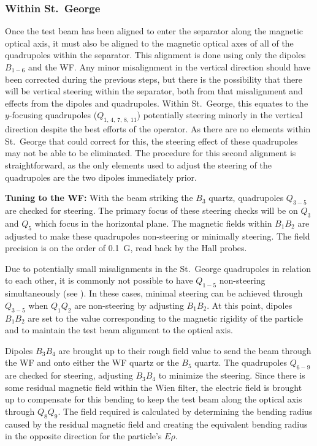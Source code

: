 \subsubsection{Within St.\ George}
\label{sec:tuning_stg}

Once the test beam has been aligned to enter the separator along the
magnetic optical axis, it must also be aligned to the magnetic optical
axes of all of the quadrupoles within the separator. This alignment is
done using only the dipoles $B_{1-6}$ and the WF. Any minor misalignment
in the vertical direction should have been corrected during the previous
steps, but there is the possibility that there will be vertical steering
within the separator, both from that misalignment and effects from the
dipoles and quadrupoles. Within St.\ George, this equates to the
$y$-focusing quadrupoles ($Q_{1,\,4,\,7,\,8,\,11}$) potentially steering
minorly in the vertical direction despite the best efforts of the
operator. As there are no elements within St.\ George that could correct
for this, the steering effect of these quadrupoles may not be able to be
eliminated. The procedure for this second alignment is straightforward,
as the only elements used to adjust the steering of the quadrupoles are
the two dipoles immediately prior.

\textbf{Tuning to the WF:}
With the beam striking the $B_3$ quartz, quadrupoles $Q_{3-5}$ are
checked for steering. The primary focus of these steering checks will be
on $Q_3$ and $Q_5$ which focus in the horizontal plane. The magnetic
fields within $B_1B_2$ are adjusted to make these quadrupoles
non-steering or minimally steering. The field precision is on the order
of 0.1~G, read back by the Hall probes.

Due to potentially small misalignments in the St.\ George quadrupoles in
relation to each other, it is commonly not possible to have $Q_{1-5}$
non-steering simultaneously (see \cite{Meisel2017}). In these cases,
minimal steering can be achieved through $Q_{3-5}$ when $Q_1Q_2$ are
non-steering by adjusting $B_1B_2$. At this point, dipoles $B_1B_2$ are
set to the value corresponding to the magnetic rigidity of the particle
and to maintain the test beam alignment to the optical axis.

Dipoles $B_3B_4$ are brought up to their rough field value to send the
beam through the WF and onto either the WF quartz or the $B_5$ quartz.
The quadrupoles $Q_{6-9}$ are checked for steering, adjusting $B_3B_4$
to minimize the steering. Since there is some residual magnetic field
within the Wien filter, the electric field is brought up to compensate
for this bending to keep the test beam along the optical axis through
$Q_8Q_9$. The field required is calculated by determining the bending
radius caused by the residual magnetic field and creating the equivalent
bending radius in the opposite direction for the particle's $E\rho$.

